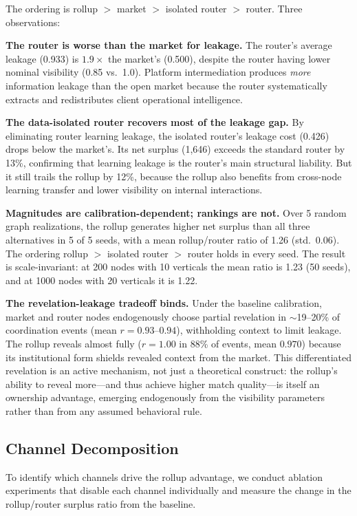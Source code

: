 \documentclass[12pt]{article}
\theoremstyle{definition}
\begin{document}
The ordering is rollup $>$ market $>$ isolated router $>$ router. Three observations:

\textbf{The router is worse than the market for leakage.} The router's average leakage (0.933) is $1.9\times$ the market's (0.500), despite the router having lower nominal visibility (0.85 vs.\ 1.0). Platform intermediation produces \textit{more} information leakage than the open market because the router systematically extracts and redistributes client operational intelligence.

\textbf{The data-isolated router recovers most of the leakage gap.} By eliminating router learning leakage, the isolated router's leakage cost (0.426) drops below the market's. Its net surplus (1,646) exceeds the standard router by 13\%, confirming that learning leakage is the router's main structural liability. But it still trails the rollup by 12\%, because the rollup also benefits from cross-node learning transfer and lower visibility on internal interactions.

\textbf{Magnitudes are calibration-dependent; rankings are not.} Over 5 random graph realizations, the rollup generates higher net surplus than all three alternatives in 5 of 5 seeds, with a mean rollup/router ratio of 1.26 (std.\ 0.06). The ordering rollup $>$ isolated router $>$ router holds in every seed. The result is scale-invariant: at 200 nodes with 10 verticals the mean ratio is 1.23 (50 seeds), and at 1000 nodes with 20 verticals it is 1.22.

\textbf{The revelation-leakage tradeoff binds.} Under the baseline calibration, market and router nodes endogenously choose partial revelation in $\sim$19--20\% of coordination events (mean $r = 0.93$--$0.94$), withholding context to limit leakage. The rollup reveals almost fully ($r = 1.00$ in 88\% of events, mean $0.970$) because its institutional form shields revealed context from the market. This differentiated revelation is an active mechanism, not just a theoretical construct: the rollup's ability to reveal more---and thus achieve higher match quality---is itself an ownership advantage, emerging endogenously from the visibility parameters rather than from any assumed behavioral rule.

\subsection{Channel Decomposition}

To identify which channels drive the rollup advantage, we conduct ablation experiments that disable each channel individually and measure the change in the rollup/router surplus ratio from the baseline.
\end{document}
